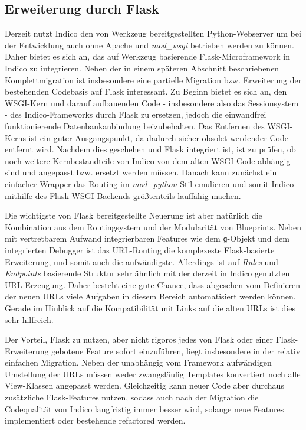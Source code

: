 \subsection{Erweiterung durch Flask}\label{migration-flask-partial}
Derzeit nutzt Indico den von Werkzeug bereitgestellten Python-Webserver um bei der Entwicklung auch
ohne Apache und \emph{mod\_wsgi} betrieben werden zu können. Daher bietet es sich an, das auf
Werkzeug basierende Flask-Microframework in Indico zu integrieren. Neben der in einem späteren
Abschnitt beschriebenen Komplettmigration ist insbesondere eine partielle Migration bzw. Erweiterung
der bestehenden Codebasis auf Flask interessant. Zu Beginn bietet es sich an, den WSGI-Kern und
darauf aufbauenden Code - insbesondere also das Sessionsystem - des Indico-Frameworks durch Flask
zu ersetzen, jedoch die einwandfrei funktionierende Datenbankanbindung beizubehalten.
Das Entfernen des WSGI-Kerns ist ein guter Ausgangspunkt, da dadurch sicher obsolet werdender
Code entfernt wird. Nachdem dies geschehen und Flask integriert ist, ist zu prüfen, ob noch weitere
Kernbestandteile von Indico von dem alten WSGI-Code abhängig sind und angepasst bzw. ersetzt werden
müssen. Danach kann zunächst ein einfacher Wrapper das Routing im \emph{mod\_python}-Stil emulieren
und somit Indico mithilfe des Flask-WSGI-Backends größtenteils lauffähig machen.

Die wichtigste von Flask bereitgestellte Neuerung ist aber natürlich die Kombination aus dem
Routingsystem und der Modularität von Blueprints. Neben mit vertretbarem Aufwand integrierbaren
Features wie dem \lstinline{g}-Objekt und dem integrierten Debugger ist das URL-Routing die
komplexeste Flask-basierte Erweiterung, und somit auch die aufwändigste. Allerdings ist auf
\emph{Rules} und \emph{Endpoints} basierende Struktur sehr ähnlich mit der derzeit in Indico
genutzten URL-Erzeugung. Daher besteht eine gute Chance, dass abgesehen vom Definieren der neuen
URLs viele Aufgaben in diesem Bereich automatisiert werden können. Gerade im Hinblick auf die
Kompatibilität mit Links auf die alten URLs ist dies sehr hilfreich.

Der Vorteil, Flask zu nutzen, aber nicht rigoros jedes von Flask oder einer Flask-Erweiterung
gebotene Feature sofort einzuführen, liegt insbesondere in der relativ einfachen Migration. Neben
der unabhängig vom Framework aufwändigen Umstellung der URLs müssen weder zwangsläufig Templates
konvertiert noch alle View-Klassen angepasst werden. Gleichzeitig kann neuer Code aber durchaus
zusätzliche Flask-Features nutzen, sodass auch nach der Migration die Codequalität von Indico
langfristig immer besser wird, solange neue Features implementiert oder bestehende refactored
werden.


